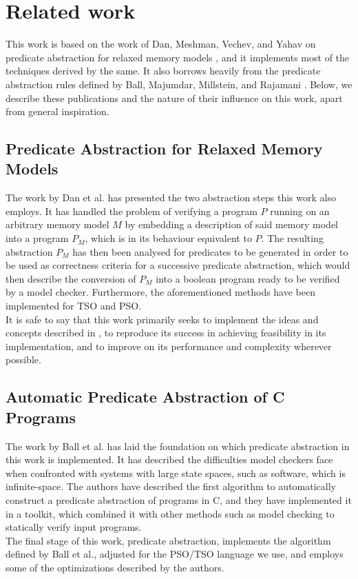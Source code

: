 \section{Related work}

This work is based on the work of Dan, Meshman, Vechev, and Yahav on predicate abstraction for relaxed memory models \cite{danetal13}, and it implements most of the techniques derived by the same. It also borrows heavily from the predicate abstraction rules defined by Ball, Majumdar, Millstein, and Rajamani \cite{balletal01}. Below, we describe these publications and the nature of their influence on this work, apart from general inspiration.

\subsection{Predicate Abstraction for Relaxed Memory Models}

The work by Dan et al. \cite{danetal13} has presented the two abstraction steps this work also employs. It has handled the problem of verifying a program $P$ running on an arbitrary memory model $M$ by embedding a description of said memory model into a program $P_M$, which is in its behaviour equivalent to $P$. The resulting abstraction $P_M$ has then been analysed for predicates to be generated in order to be used as correctness criteria for a successive predicate abstraction, which would then describe the conversion of $P_M$ into a boolean program ready to be verified by a model checker. Furthermore, the aforementioned methods have been implemented for TSO and PSO.\\

It is safe to say that this work primarily seeks to implement the ideas and concepts described in \cite{danetal13}, to reproduce its success in achieving feasibility in its implementation, and to improve on its performance and complexity wherever possible.

\subsection{Automatic Predicate Abstraction of C Programs}

The work by Ball et al. \cite{balletal01} has laid the foundation on which predicate abstraction in this work is implemented. It has described the difficulties model checkers face when confronted with systems with large state spaces, such as software, which is infinite-space. The authors have described the first algorithm to automatically construct a predicate abstraction of programs in C, and they have implemented it in a toolkit, which combined it with other methods such as model checking to statically verify input programs.\\

The final stage of this work, predicate abstraction, implements the algorithm defined by Ball et al., adjusted for the PSO/TSO language we use, and employs some of the optimizations described by the authors.